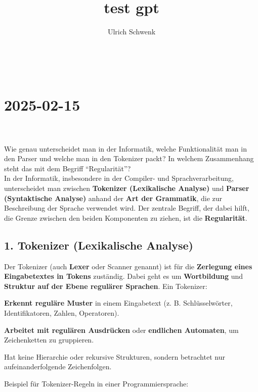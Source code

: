 \documentclass[a4paper]{article}
\author{Ulrich Schwenk}
\title{test gpt}
\begin{document}
\setlength{\tabulinesep}{6pt}
\maketitle
\newpage

\begin{dialogue}
 \leavevmode\\
\end{dialogue}




\section*{2025-02-15}
\begin{dialogue}
 \leavevmode\\
 \leavevmode\\
Wie genau unterscheidet man in der Informatik, welche Funktionalität man in den Parser und welche man in den Tokenizer packt? In welchem Zusammenhang steht das mit dem Begriff "`Regularität"'?
 \leavevmode\\
In der Informatik, insbesondere in der Compiler- und Sprachverarbeitung, unterscheidet man zwischen \textbf{Tokenizer (Lexikalische Analyse)} und \textbf{Parser (Syntaktische Analyse)} anhand der \textbf{Art der Grammatik}, die zur Beschreibung der Sprache verwendet wird. Der zentrale Begriff, der dabei hilft, die Grenze zwischen den beiden Komponenten zu ziehen, ist die \textbf{Regularität}.

\end{dialogue}
\subsection*{1. Tokenizer (Lexikalische Analyse)}
Der Tokenizer (auch \textbf{Lexer} oder Scanner genannt) ist für die \textbf{Zerlegung eines Eingabetextes in Tokens} zuständig. Dabei geht es um \textbf{Wortbildung} und \textbf{Struktur auf der Ebene regulärer Sprachen}. Ein Tokenizer:
\begin{itemize}
  \begin{item}
    \textbf{Erkennt reguläre Muster} in einem Eingabetext (z. B. Schlüsselwörter, Identifikatoren, Zahlen, Operatoren).
  \end{item}
  \begin{item}
    \textbf{Arbeitet mit regulären Ausdrücken} oder \textbf{endlichen Automaten}, um Zeichenketten zu gruppieren.
  \end{item}
  \begin{item}
    Hat keine Hierarchie oder rekursive Strukturen, sondern betrachtet nur aufeinanderfolgende Zeichenfolgen.
  \end{item}
\end{itemize}
Beispiel für Tokenizer-Regeln in einer Programmiersprache:
\end{document}

